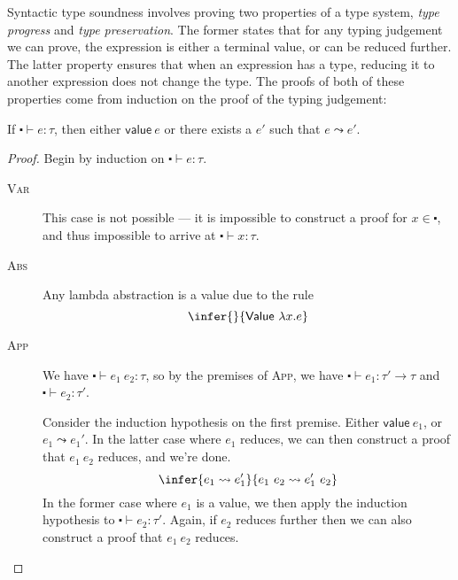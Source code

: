 Syntactic type soundness involves proving two properties of a type
system, \textit{type progress} and \textit{type preservation}.
The former states that for any typing judgement we can prove, the
expression is either a terminal value, or can be reduced further. The
latter property ensures that when an expression has a type, reducing
it to another expression does not change the type.
The proofs of both of these properties come from induction on the
proof of the typing judgement:

\begin{theorem}[Progress]\label{thm:progress}
  If $\centerdot \vdash e : \tau$, then either $\textsf{value} \ e$ or there exists a $e'$ such that $e \leadsto e'$.
\end{theorem}
\begin{proof}
  Begin by induction on $\centerdot \vdash e : \tau$.
  \begin{description}
  \item[\rm\textsc{Var}] This case is not possible --- it is impossible
    to construct a proof for $x \in \centerdot$, and thus impossible to arrive at
    $\centerdot \vdash x : \tau$.
  \item[\rm\textsc{Abs}] Any lambda abstraction is a value due to the
    rule
    \[\infer{ }{\textsf{Value} \ \lambda x . e}\]
  \item[\rm\textsc{App}] We have $\centerdot \vdash e_1 \ e_2 : \tau$, so by the premises
    of \textsc{App}, we have $\centerdot \vdash e_1 : \tau' \rightarrow \tau$ and $\centerdot \vdash e_2 :
    \tau'$.

    Consider the induction hypothesis on the first premise. Either
    $\textsf{value} \ e_1$, or $e_1 \leadsto e_1'$. In the latter case where
    $e_1$ reduces, we can then construct a proof that $e_1 \ e_2$
    reduces, and we're done.
    \[\infer{e_1 \leadsto e_1'}{e_1 \ e_2 \leadsto e_1' \ e_2}\]
    In the former case where $e_1$ is a value, we then apply the
    induction hypothesis to $\centerdot \vdash e_2 : \tau'$. Again, if $e_2$ reduces
    further then we can also construct a proof that $e_1 \ e_2$
    reduces.
    

\end{description}
\end{proof}

